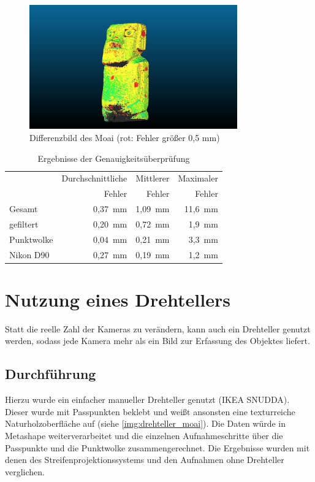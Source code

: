 \documentclass[./00PhotoBox.tex]{subfiles}
\begin{document}
\begin{figure}
    \centering
    \includegraphics[width=0.8\textwidth]{img/moai_fehler.jpg}
    \caption{Differenzbild des Moai (rot: Fehler größer 0,5 mm)}
    \label{img:differenz_moai}
\end{figure}

\begin{table}
    \centering
    \caption{Ergebnisse der Genauigkeitsüberprüfung}
    \label{tab:vergleich_erg}
    \begin{tabular}{l|r|r|r}
        \toprule
                   & Durchschnittliche & Mittlerer & Maximaler \\
                   & Fehler            & Fehler    & Fehler    \\
        \midrule
        Gesamt     & 0,37~mm           & 1,09~mm   & 11,6~mm   \\  %
        gefiltert  & 0,20~mm           & 0,72~mm   & 1,9~mm    \\
        \midrule
        Punktwolke & 0,04~mm           & 0,21~mm   & 3,3~mm    \\  %
        \midrule
        Nikon D90  & 0,27~mm           & 0,19~mm   & 1,2~mm    \\
        \bottomrule
    \end{tabular}
\end{table}


\section{Nutzung eines Drehtellers}
\label{s:drehteller}
Statt die reelle Zahl der Kameras zu verändern, kann auch ein Drehteller genutzt werden, sodass jede Kamera mehr als ein Bild zur Erfassung des Objektes liefert.

\subsection{Durchführung}
Hierzu wurde ein einfacher manueller Drehteller genutzt (IKEA SNUDDA). Dieser wurde mit Passpunkten beklebt und weißt ansonsten eine texturreiche Naturholzoberfläche auf (siehe \autoref{img:drehteller_moai}). Die Daten würde in Metashape weiterverarbeitet und die einzelnen Aufnahmeschritte über die Passpunkte und die Punktwolke zusammengerechnet. Die Ergebnisse wurden mit denen des Streifenprojektionssystems und den Aufnahmen ohne Drehteller verglichen.
\end{document}
